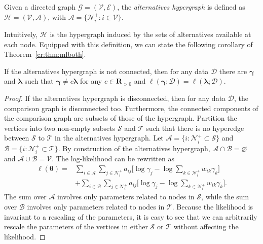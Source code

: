 \begin{definition}
Given a directed graph $\mathcal{G} = (\mathcal{V}, \mathcal{E})$, the \emph{alternatives hypergraph} is defined as $\mathcal{H} = (\mathcal{V}, \mathcal{A})$, with $\mathcal{A} = \{ \mathcal{N}^+_i : i \in \mathcal{V} \}$.
\end{definition}

Intuitively, $\mathcal{H}$ is the hypergraph induced by the sets of alternatives available at each node.
Equipped with this definition, we can state the following corollary of Theorem~\ref{cr:thm:mlboth}.

\begin{corollary}
\label{cr:thm:mlnecessary}
If the alternatives hypergraph is not connected, then for any data $\mathcal{D}$ there are $\bm{\gamma}$ and $\bm{\lambda}$ such that $\bm{\gamma} \neq c \bm{\lambda}$ for any $c \in \mathbf{R}_{>0}$ and $\ell(\bm{\gamma} ; \mathcal{D}) = \ell(\bm{\lambda} ; \mathcal{D}).$
\end{corollary}

\begin{proof}
If the alternatives hypergraph is disconnected, then for any data $\mathcal{D}$, the comparison graph is disconnected too.
Furthermore, the connected components of the comparison graph are subsets of those of the hypergraph.
Partition the vertices into two non-empty subsets $\mathcal{S}$ and $\mathcal{T}$ such that there is no hyperedge between $\mathcal{S}$ to $\mathcal{T}$ in the alternatives hypergraph.
Let $\mathcal{A} = \{ i : \mathcal{N}^+_i \subset \mathcal{S} \}$ and $\mathcal{B} = \{ i : \mathcal{N}^+_i \subset \mathcal{T} \}$.
By construction of the alternatives hypergraph, $\mathcal{A} \cap \mathcal{B} = \varnothing$ and $\mathcal{A} \cup \mathcal{B} = \mathcal{V}$.
The log-likelihood can be rewritten as
\begin{align*}
\ell(\bm{\theta}) =
    &\sum_{i \in \mathcal{A}} \sum_{j \in \mathcal{N}^+_i} a_{ij}
        \bigg[ \log \gamma_j - \log \sum_{k \in \mathcal{N}^+_i} w_{ik} \gamma_k \bigg] \\
    &+ \sum_{i \in \mathcal{B}} \sum_{j \in \mathcal{N}^+_i} a_{ij}
        \bigg[ \log \gamma_j - \log \sum_{k \in \mathcal{N}^+_i} w_{ik} \gamma_k \bigg].
\end{align*}
The sum over $\mathcal{A}$ involves only parameters related to nodes in $\mathcal{S}$, while the sum over $\mathcal{B}$ involves only parameters related to nodes in $\mathcal{T}$.
Because the likelihood is invariant to a rescaling of the parameters, it is easy to see that we can arbitrarily rescale the parameters of the vertices in either $\mathcal{S}$ or $\mathcal{T}$ without affecting the likelihood.
\end{proof}

